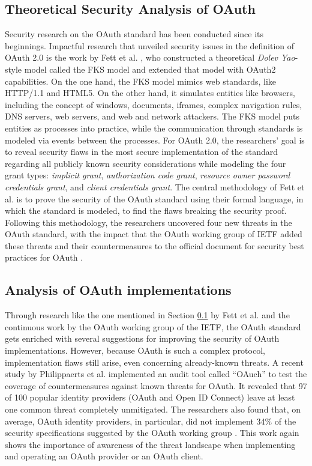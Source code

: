 \documentclass[
    fontsize=12pt,
    headings=small,
    parskip=half,           %
    bibliography=totoc,
    numbers=noenddot,       %
    open=any,               %
    ]{scrreprt}
\begin{document}
\subsection{Theoretical Security Analysis of OAuth}
\label{subsec:fks_model}
Security research on the OAuth standard has been conducted since its beginnings. Impactful research that unveiled security issues in the definition of OAuth 2.0 is the work by Fett et al. \cite{fett2016comprehensive}, who constructed a theoretical \emph{Dolev Yao}-style model called the FKS model and extended that model with OAuth2 capabilities. On the one hand, the FKS model mimics web standards, like HTTP/1.1 and HTML5. On the other hand, it simulates entities like browsers, including the concept of windows, documents, iframes, complex navigation rules, DNS servers, web servers, and web and network attackers. The FKS model puts entities as processes into practice, while the communication through standards is modeled via events between the processes. For OAuth 2.0, the researchers' goal is to reveal security flaws in the most secure implementation of the standard regarding all publicly known security considerations while modeling the four grant types: \emph{implicit grant}, \emph{authorization code grant}, \emph{resource owner password credentials grant}, and \emph{client credentials grant}. The central methodology of Fett et al. is to prove the security of the OAuth standard using their formal language, in which the standard is modeled, to find the flaws breaking the security proof. Following this methodology, the researchers uncovered four new threats in the  OAuth standard, with the impact that the OAuth working group of IETF added these threats and their countermeasures to the official document for security best practices for OAuth \cite{lodderstedt2020oauth}.

\subsection{Analysis of OAuth implementations}
Through research like the one mentioned in Section \ref{subsec:fks_model} by Fett et al. and the continuous work by the OAuth working group of the IETF, the OAuth standard gets enriched with several suggestions for improving the security of OAuth implementations. However, because OAuth is such a complex protocol, implementation flaws still arise, even concerning already-known threats. A recent study by Philippaerts et al. implemented an audit tool called ``OAuch'' to test the coverage of countermeasures against known threats for OAuth. It revealed that 97 of 100 popular identity providers (OAuth and Open ID Connect) leave at least one common threat completely unmitigated. The researchers also found that, on average, OAuth identity providers, in particular, did not implement 34\% of the security specifications suggested by the OAuth working group \cite{philippaerts2022oauch}. This work again shows the importance of awareness of the threat landscape when implementing and operating an OAuth provider or an OAuth client.
\end{document}
